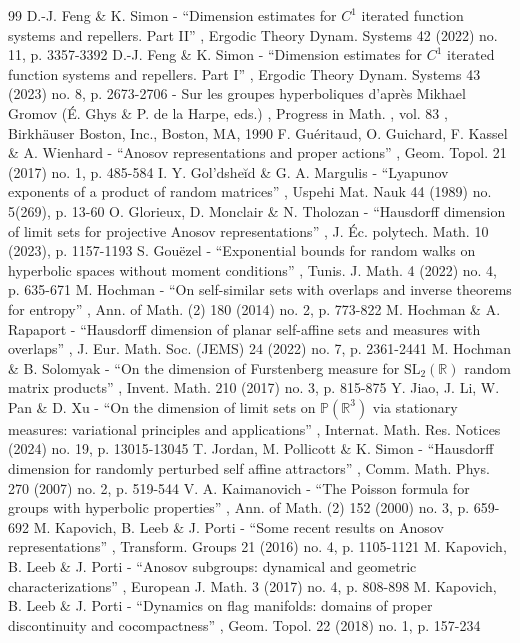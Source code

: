\begin{thebibliography}{99}
 D.-J. Feng \& K. Simon - “Dimension estimates for $C^1$ iterated function systems and repellers. Part II” , Ergodic Theory Dynam. Systems 42 (2022) no. 11, p. 3357-3392
 D.-J. Feng \& K. Simon - “Dimension estimates for $C^1$ iterated function systems and repellers. Part I” , Ergodic Theory Dynam. Systems 43 (2023) no. 8, p. 2673-2706
 - Sur les groupes hyperboliques d’après Mikhael Gromov (É. Ghys \& P. de la Harpe, eds.) , Progress in Math. , vol. 83 , Birkhäuser Boston, Inc., Boston, MA, 1990
 F. Guéritaud, O. Guichard, F. Kassel \& A. Wienhard - “Anosov representations and proper actions” , Geom. Topol. 21 (2017) no. 1, p. 485-584
 I. Y. Gol’dsheĭd \& G. A. Margulis - “Lyapunov exponents of a product of random matrices” , Uspehi Mat. Nauk 44 (1989) no. 5(269), p. 13-60
 O. Glorieux, D. Monclair \& N. Tholozan - “Hausdorff dimension of limit sets for projective Anosov representations” , J. Éc. polytech. Math. 10 (2023), p. 1157-1193
 S. Gouëzel - “Exponential bounds for random walks on hyperbolic spaces without moment conditions” , Tunis. J. Math. 4 (2022) no. 4, p. 635-671
 M. Hochman - “On self-similar sets with overlaps and inverse theorems for entropy” , Ann. of Math. (2) 180 (2014) no. 2, p. 773-822
 M. Hochman \& A. Rapaport - “Hausdorff dimension of planar self-affine sets and measures with overlaps” , J. Eur. Math. Soc. (JEMS) 24 (2022) no. 7, p. 2361-2441
 M. Hochman \& B. Solomyak - “On the dimension of Furstenberg measure for $\mathrm{SL}_2(\mathbb{R})$ random matrix products” , Invent. Math. 210 (2017) no. 3, p. 815-875
 Y. Jiao, J. Li, W. Pan \& D. Xu - “On the dimension of limit sets on $\mathbb{P} (\mathbb{R}^3)$ via stationary measures: variational principles and applications” , Internat. Math. Res. Notices (2024) no. 19, p. 13015-13045
 T. Jordan, M. Pollicott \& K. Simon - “Hausdorff dimension for randomly perturbed self affine attractors” , Comm. Math. Phys. 270 (2007) no. 2, p. 519-544
 V. A. Kaimanovich - “The Poisson formula for groups with hyperbolic properties” , Ann. of Math. (2) 152 (2000) no. 3, p. 659-692
 M. Kapovich, B. Leeb \& J. Porti - “Some recent results on Anosov representations” , Transform. Groups 21 (2016) no. 4, p. 1105-1121
 M. Kapovich, B. Leeb \& J. Porti - “Anosov subgroups: dynamical and geometric characterizations” , European J. Math. 3 (2017) no. 4, p. 808-898
 M. Kapovich, B. Leeb \& J. Porti - “Dynamics on flag manifolds: domains of proper discontinuity and cocompactness” , Geom. Topol. 22 (2018) no. 1, p. 157-234

\end{thebibliography}
